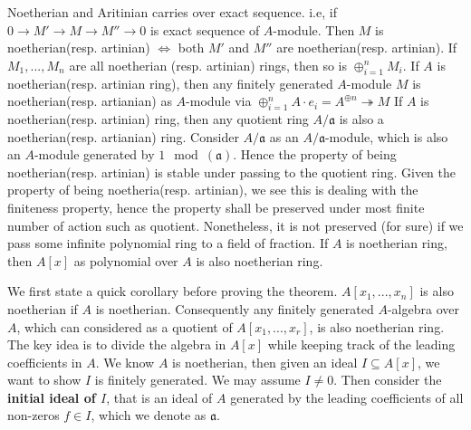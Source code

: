 \documentclass[12pt]{article}
\theoremstyle{definition}
\theoremstyle{plain}
\newcommand{\surj}{\twoheadrightarrow}
\begin{document}
\Prop Noetherian and Aritinian carries over exact sequence. i.e, if $0\to M'\to M\to M''\to 0$ is exact sequence of $A$-module. Then $M$ is noetherian(resp. artinian) $\iff$ both $M'$ and $M''$ are noetherian(resp. artinian).
\Cor If $M_1, ..., M_n$ are all noetherian (resp. artinian) rings, then so is $\oplus_{i=1}^n M_i$.
\Cor If $A$ is noetherian(resp. artinian ring), then any finitely generated $A$-module $M$ is noetherian(resp. artianian) as $A$-module via $\oplus_{i=1}^n A\cdot e_i=A^{\oplus n}\surj M$
\Cor If $A$ is noetherian(resp. artinian) ring, then any quotient ring $A/\mathfrak{a}$ is also a noetherian(resp. artianian) ring.
\proof Consider $A/\mathfrak{a}$ as an $A/\mathfrak{a}$-module, which is also an $A$-module generated by $1\mod(\mathfrak{a})$. Hence the property of being noetherian(resp. artinian) is stable under passing to the quotient ring.
\Rmk Given the property of being noetheria(resp. artinian), we see this is dealing with the finiteness property, hence the property shall be preserved under most finite number of action such as quotient. Nonetheless, it is not preserved (for sure) if we pass some infinite polynomial ring to a field of fraction.
 If $A$ is noetherian ring, then $A[x]$ as polynomial over $A$ is also noetherian ring.

\medskip
We first state a quick corollary before proving the theorem.
\Cor $A[x_1, ..., x_n]$ is also noetherian if $A$ is noetherian. Consequently any finitely generated $A$-algebra over $A$, which can considered as a quotient of $A[x_1, ..., x_r]$, is also noetherian ring.
 The key idea is to divide the algebra in $A[x]$ while keeping track of the leading coefficients in $A$. We know $A$ is noetherian, then given an ideal $I\subseteq A[x]$, we want to show $I$ is finitely generated. We may assume $I\neq 0$. Then consider the \textbf{initial ideal of $I$}, that is an ideal of $A$ generated by the leading coefficients of all non-zeros $f\in I$, which we denote as $\mathfrak{a}$.
\end{document}
